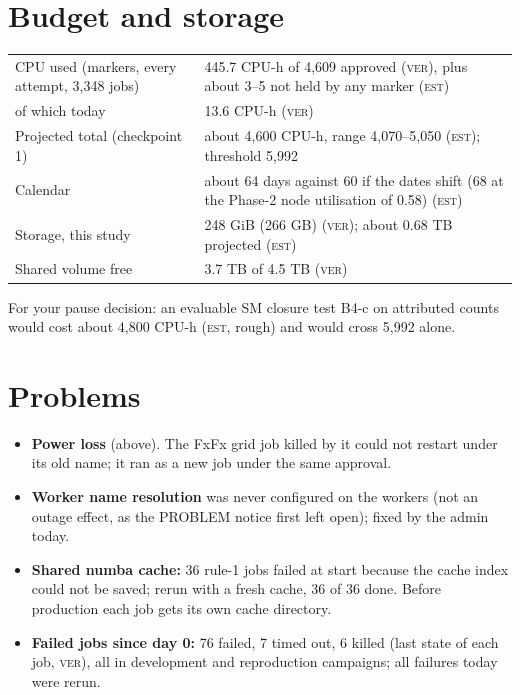 \documentclass[11pt,a4paper]{article}
\newcommand{\est}{\textsc{est}}
\newcommand{\ver}{\textsc{ver}}
\begin{document}
\section{Budget and storage}
\begin{center}
\begin{tabular}{L{7.6cm}L{6.4cm}}
\toprule
CPU used (markers, every attempt, 3{,}348 jobs) & 445.7 CPU-h of 4{,}609 approved (\ver), plus about 3--5 not
                 held by any marker (\est) \\
\quad of which today & 13.6 CPU-h (\ver) \\
Projected total (checkpoint 1) & about 4{,}600 CPU-h, range 4{,}070--5{,}050 (\est); threshold 5{,}992 \\
Calendar & about 64 days against 60 if the dates shift (68 at the Phase-2 node utilisation of 0.58) (\est) \\
Storage, this study & 248 GiB (266 GB) (\ver); about 0.68 TB projected (\est) \\
Shared volume free & 3.7 TB of 4.5 TB (\ver) \\
\bottomrule
\end{tabular}
\end{center}
For your pause decision: an evaluable SM closure test B4-c on attributed counts would cost about 4{,}800 CPU-h
(\est, rough) and would cross 5{,}992 alone.

\section{Problems}
\begin{itemize}
\item \textbf{Power loss} (above). The FxFx grid job killed by it could not restart under its old name; it ran
      as a new job under the same approval.
\item \textbf{Worker name resolution} was never configured on the workers (not an outage effect, as the PROBLEM
      notice first left open); fixed by the admin today.
\item \textbf{Shared numba cache:} 36 rule-1 jobs failed at start because the cache index could not be saved; rerun
      with a fresh cache, 36 of 36 done. Before production each job gets its own cache directory.
\item \textbf{Failed jobs since day 0:} 76 failed, 7 timed out, 6 killed (last state of each job, \ver), all in
      development and reproduction campaigns; all failures today were rerun.
\end{itemize}
\end{document}

